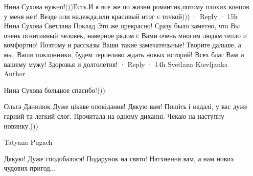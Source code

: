 Нина Сухова нужно!)))Есть.И я все же по жизни романтик,потому плохих концов у меня нет! Везде или надежда,или красивый итог с точкой)))
 · Reply · 15h
Нина Сухова
Светлана Поклад Это же прекрасно! Сразу было заметно, что Вы очень позитивный человек, наверное рядом с Вами очень многим людям тепло и комфортно! Поэтому и рассказы Ваши такие замечательные! Творите дальше, а мы, Ваши поклонники, будем терпеливо ждать новых историй! Всех благ Вам и вашему мужу! Здоровья и долголетия!
 · Reply · 14h
Svetlana Kievljanka
Author

Нина Сухова большое спасибо!)))

Ольга Данилюк
Дуже цікаве оповідання! Дякую вам! Пишіть і надалі, у вас дуже гарний та легкий слог. Прочитала на одному диханні. Чекаю на наступну новинку.)))

Tatyana Pugach

Дякую! Дуже сподобалося!
Подарунок на свято!
Натхнення вам, а нам нових чудових пригод...
